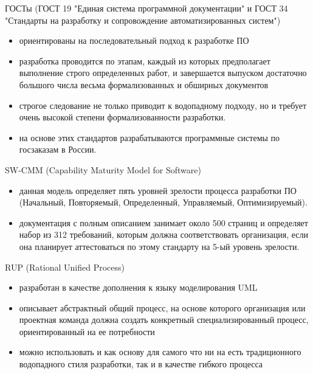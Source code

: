 \documentclass{beamer}
\begin{document}
\begin{frame}[t]
ГОСТы (ГОСТ 19 "Единая система программной документации" и ГОСТ 34 "Стандарты
на разработку и сопровождение автоматизированных систем")
\begin{itemize}
\item ориентированы на последовательный подход к разработке ПО
\item разработка проводится по этапам, каждый из которых предполагает выполнение строго определенных работ, и завершается выпуском достаточно большого числа весьма формализованных и обширных документов
\item строгое следование не только приводит к водопадному подходу, но и требует очень высокой степени формализованности разработки.
\item на основе этих стандартов разрабатываются программные системы по госзаказам в России.
\end{itemize}
\end{frame}

\begin{frame}[t]
SW-CMM (Capability Maturity Model for Software)
\begin{itemize}
\item данная модель определяет пять уровней зрелости процесса разработки ПО (Начальный, Повторяемый, Определенный, Управляемый, Оптимизируемый).
\item документация с полным описанием занимает около 500 страниц и определяет набор из 312 требований, которым должна соответствовать организация, если она планирует аттестоваться по этому стандарту на 5-ый уровень зрелости.
\end{itemize}
\end{frame}

\begin{frame}[t]
RUP (Rational Unified Process)
\begin{itemize}
\item разработан в качестве дополнения к языку моделирования UML
\item описывает абстрактный общий процесс, на основе которого организация или проектная команда должна
создать конкретный специализированный процесс, ориентированный на ее потребности
\item можно использовать и как основу для самого что ни на есть традиционного водопадного стиля разработки, так и в качестве гибкого процесса
\end{itemize}
\end{frame}
\end{document}
